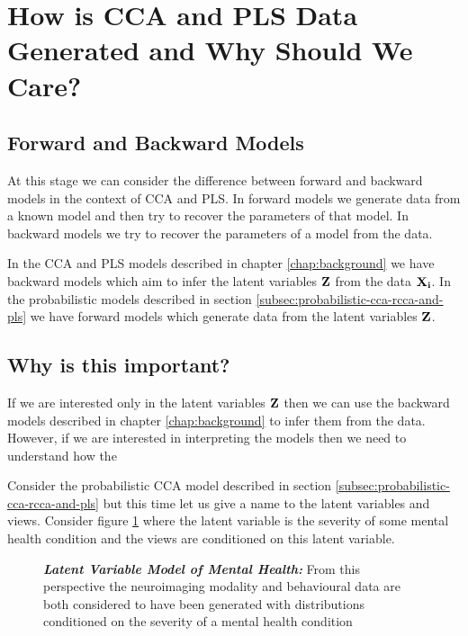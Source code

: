 \section{How is CCA and PLS Data Generated and Why Should We Care?}\label{sec:how-is-cca-and-pls-data-generated-and-why-should-we-care?}

\subsection{Forward and Backward Models}

At this stage we can consider the difference between forward and backward models in the context of CCA and PLS.
In forward models we generate data from a known model and then try to recover the parameters of that model.
In backward models we try to recover the parameters of a model from the data.

In the CCA and PLS models described in chapter \ref{chap:background} we have backward models which aim to infer the
latent variables $\bold{Z}$ from the data $\bold{X_i}$.
In the probabilistic models described in section \ref{subsec:probabilistic-cca-rcca-and-pls} we have forward models which
generate data from the latent variables $\bold{Z}$.

\subsection{Why is this important?}

If we are interested only in the latent variables $\bold{Z}$ then we can use the backward models described in chapter
\ref{chap:background} to infer them from the data.
However, if we are interested in interpreting the models then we need to understand how the

Consider the probabilistic CCA model described in section \ref{subsec:probabilistic-cca-rcca-and-pls} but this time
let us give a name to the latent variables and views.
Consider figure \ref{fig:mentalhealthselfsupervised} where the latent variable is the severity of some mental health
condition and the views are conditioned on this latent variable.

\begin{figure}
    \centering
    \caption[Latent Variable Model of Mental Health]{\textit{\textbf{Latent Variable Model of Mental Health:}} From this perspective the neuroimaging modality and behavioural data are both considered to have been generated with distributions conditioned on the severity of a mental health condition}\label{fig:mentalhealthselfsupervised}
\end{figure}

